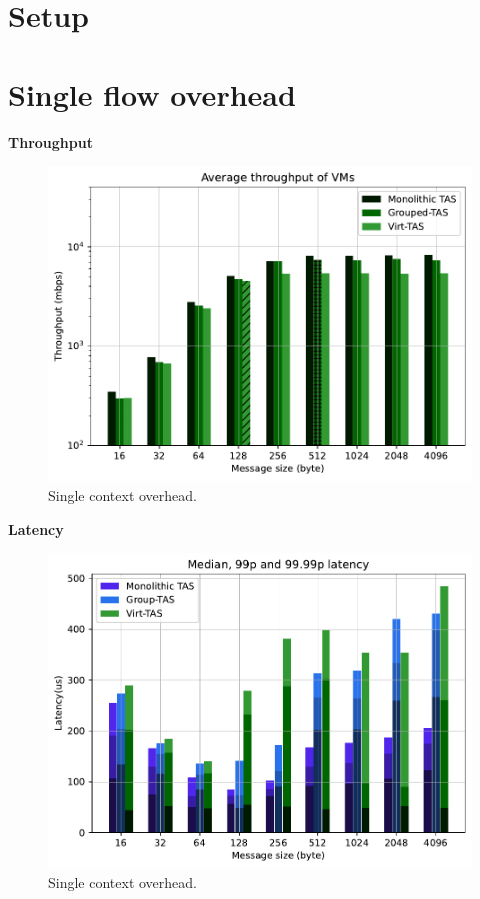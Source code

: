 \section{Setup}

\section{Single flow overhead}

\textbf{Throughput}

\begin{figure}
    \centering
    \includegraphics[scale=0.8]{../results/overhead.throughput.pdf}
    \caption{Single context overhead.}
    \label{fig:overhead.throughput}
\end{figure}

\textbf{Latency}

\begin{figure}
    \centering
    \includegraphics[scale=0.8]{../results/overhead.latency.pdf}
    \caption{Single context overhead.}
    \label{fig:overhead.latency}
\end{figure}




